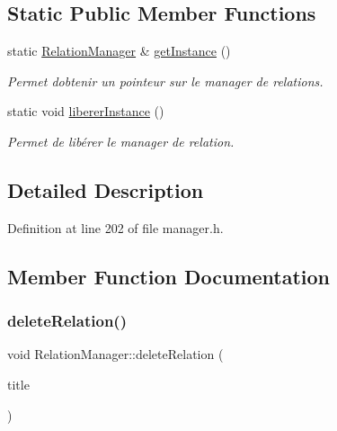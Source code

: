 \subsection*{Static Public Member Functions}
\begin{DoxyCompactItemize}
\item 
\mbox{\label{class_relation_manager_a35c3622f29ccfbda84be848503041396}} 
static \hyperlink{class_relation_manager}{Relation\+Manager} \& \hyperlink{class_relation_manager_a35c3622f29ccfbda84be848503041396}{get\+Instance} ()
\begin{DoxyCompactList}\small\item\em Permet d\textquotesingle{}obtenir un pointeur sur le manager de relations. \end{DoxyCompactList}\item 
\mbox{\label{class_relation_manager_a64126ecfdd2046d9c9797e80427bcba3}} 
static void \hyperlink{class_relation_manager_a64126ecfdd2046d9c9797e80427bcba3}{liberer\+Instance} ()
\begin{DoxyCompactList}\small\item\em Permet de libérer le manager de relation. \end{DoxyCompactList}\end{DoxyCompactItemize}


\subsection{Detailed Description}


Definition at line 202 of file manager.\+h.



\subsection{Member Function Documentation}
\mbox{\label{class_relation_manager_a074413b3ed72a1342821e911c1fa3587}} 
\subsubsection{\texorpdfstring{delete\+Relation()}{deleteRelation()}}
{\footnotesize\ttfamily void Relation\+Manager\+::delete\+Relation (\begin{DoxyParamCaption}\item[{const Q\+String \&}]{title }\end{DoxyParamCaption})}



